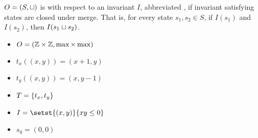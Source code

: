 $O = (S, \sqcup)$ is  with respect to an invariant
$I$, abbreviated , if invariant satisfying states are
closed under merge. That is, for every state $s_1, s_2 \in S$, if
$I(s_1)$ and $I(s_2)$, then $I(s_1 \sqcup s_2)$.

\begin{multicols}{2}
  \begin{itemize}
    \item $O = (\mathbb{Z} \times \mathbb{Z}, \max \times \max)$
    \item $t_x((x, y)) = (x + 1, y)$
    \item $t_y((x, y)) = (x, y - 1)$
    \item $T = \{t_x, t_y\}$
    \item $I = \setst{(x, y)}{xy \leq 0}$
    \item $s_0 = (0, 0)$
  \end{itemize}
\end{multicols}

\newcommand{\xmin}{-2}
\newcommand{\xmax}{2}
\newcommand{\ymin}{-2}
\newcommand{\ymax}{2}

\newcommand{\xyaxes}{
  \draw[] (\xmin.5, 0) to (\xmax.5, 0);
  \draw[] (0, \ymin.5) to (0, \ymax.5);
  \node at (\xmax + 1, 0) {$x$};
  \node at (0, \ymax + 1) {$y$};
}

\newcommand{\quadi}[5]{{
  \newcommand{\argstyle}{#1}
  \newcommand{\argxmin}{#2}
  \newcommand{\argxmax}{#3}
  \newcommand{\argymin}{#4}
  \newcommand{\argymax}{#5}
  \foreach \x in {0, ..., \argxmax} {
    \foreach \y in {0, ..., \argymax} {
      \node[\argstyle] (\x-\y) at (\x, \y) {};
    }
  }
}}

\newcommand{\quadii}[5]{{
  \newcommand{\argstyle}{#1}
  \newcommand{\argxmin}{#2}
  \newcommand{\argxmax}{#3}
  \newcommand{\argymin}{#4}
  \newcommand{\argymax}{#5}
  \foreach \x in {\argxmin, ..., 0} {
    \foreach \y in {0, ..., \argymax} {
      \node[\argstyle] (\x-\y) at (\x, \y) {};
    }
  }
}}

\newcommand{\quadiii}[5]{{
  \newcommand{\argstyle}{#1}
  \newcommand{\argxmin}{#2}
  \newcommand{\argxmax}{#3}
  \newcommand{\argymin}{#4}
  \newcommand{\argymax}{#5}
  \foreach \x in {\argxmin, ..., 0} {
    \foreach \y in {\argymin, ..., 0} {
      \node[\argstyle] (\x-\y) at (\x, \y) {};
    }
  }
}}

\newcommand{\quadiv}[5]{{
  \newcommand{\argstyle}{#1}
  \newcommand{\argxmin}{#2}
  \newcommand{\argxmax}{#3}
  \newcommand{\argymin}{#4}
  \newcommand{\argymax}{#5}
  \foreach \x in {0, ..., \argxmax} {
    \foreach \y in {\argymin, ..., 0} {
      \node[\argstyle] (\x-\y) at (\x, \y) {};
    }
  }
}}

